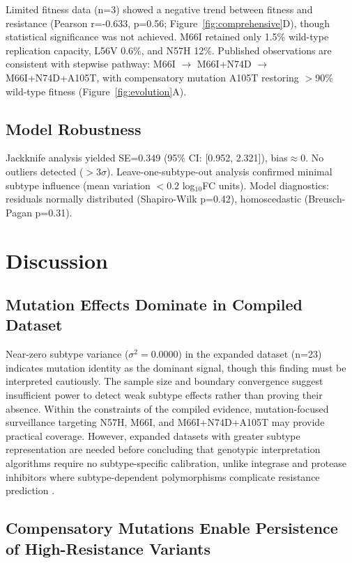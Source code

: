 \documentclass[preprint]{elsarticle}
\begin{document}
Limited fitness data (n=3) showed a negative trend between fitness and resistance (Pearson r=-0.633, p=0.56; Figure~\ref{fig:comprehensive}D), though statistical significance was not achieved. M66I retained only 1.5\% wild-type replication capacity, L56V 0.6\%, and N57H 12\%. Published observations are consistent with stepwise pathway: M66I $\rightarrow$ M66I+N74D $\rightarrow$ M66I+N74D+A105T, with compensatory mutation A105T restoring $>$90\% wild-type fitness (Figure~\ref{fig:evolution}A).

\subsection{Model Robustness}

Jackknife analysis yielded SE=0.349 (95\% CI: [0.952, 2.321]), bias$\approx$0. No outliers detected ($>3\sigma$). Leave-one-subtype-out analysis confirmed minimal subtype influence (mean variation $<$0.2 log$_{10}$FC units). Model diagnostics: residuals normally distributed (Shapiro-Wilk p=0.42), homoscedastic (Breusch-Pagan p=0.31).

\section{Discussion}

\subsection{Mutation Effects Dominate in Compiled Dataset}

Near-zero subtype variance ($\sigma^2=0.0000$) in the expanded dataset (n=23) indicates mutation identity as the dominant signal, though this finding must be interpreted cautiously. The sample size and boundary convergence suggest insufficient power to detect weak subtype effects rather than proving their absence. Within the constraints of the compiled evidence, mutation-focused surveillance targeting N57H, M66I, and M66I+N74D+A105T may provide practical coverage. However, expanded datasets with greater subtype representation are needed before concluding that genotypic interpretation algorithms require no subtype-specific calibration, unlike integrase and protease inhibitors where subtype-dependent polymorphisms complicate resistance prediction \cite{Rhee2016,Kantor2005,Wensing2019}.

\subsection{Compensatory Mutations Enable Persistence of High-Resistance Variants}
\end{document}

